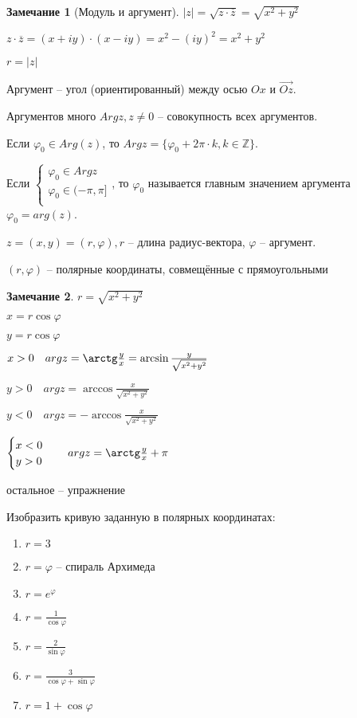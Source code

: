 \documentclass{book}
\newcommand\Z{\ensuremath{\mathbb{Z}}}
\newcommand{\ov}[1]{\overline{#1}}
\renewcommand\phi{\varphi}
\theoremstyle{definition}
\newtheorem*{note}{Замечание}
\begin{document}
    \begin{note}
        [Модуль и аргумент]

        $|z| = \sqrt{z\cdot \ov z}  = \sqrt{x^2+y^2} $ 

        $z\cdot \ov z = (x+iy)\cdot (x-iy) = x^2-(iy)^2 = x^2+y^2$

        $r = |z|$

        Аргумент -- угол (ориентированный) между осью $Ox$ и $\overset{\to }{Oz}$.

        Аргументов много $Arg z, z\neq 0$ -- совокупность всех аргументов.

        Если $\varphi_0\in Arg (z)$, то $Arg z = \{\varphi_0 + 2\pi\cdot k, k\in \Z \}$.

        Если
        $\begin{cases}
            \varphi_0\in Arg z\\
            \varphi_0\in (-\pi , \pi ]\\
        \end{cases}$, 
        то  $\varphi_0$ называется главным значением аргумента $\varphi_0 = arg(z)$. 
    \end{note}

    $z = (x,y) = (r,\phi),r$ -- длина радиус-вектора, $\phi$ --  аргумент.

    $(r, \phi)$ -- полярные координаты, совмещённые с прямоугольными
    \begin{note}
        $r = \sqrt{x^2+y^2} $

        $x = r\cos \phi$

        $y = r\cos \phi$

        $x>0\quad arg z = \arctg \frac{y}{x} = \arcsin \frac{y}{\sqrt{x^2+y^2} }$

        $y>0\quad arg z = \arccos \frac{x}{\sqrt{x^2+y^2} }$

        $y<0\quad arg z = -\arccos \frac{x}{\sqrt{x^2+y^2} } $

        $\begin{cases}
            x<0\\
            y>0\\
        \end{cases}
        \quad arg z = \arctg \frac{y}{x} + \pi$

        остальное -- упражнение
    \end{note}

    Изобразить кривую заданную в полярных координатах: 
    \begin{enumerate}
        \item $r = 3$
        \item $r = \phi$ -- спираль Архимеда
        \item $r = e^{\phi}$
        \item $r = \frac{1}{\cos \phi}$
        \item $r = \frac{2}{\sin \phi}$
        \item $r = \frac{3}{\cos \phi + \sin \phi}$
        \item $r = 1+\cos \phi$
    \end{enumerate}
\end{document}
